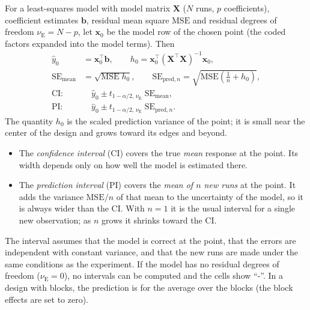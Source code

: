 For a least-squares model with model matrix $\mathbf{X}$ ($N$ runs, $p$ coefficients), coefficient estimates
$\mathbf{b}$, residual mean square $\text{MSE}$ and residual degrees of freedom $\nu_\text{E} = N - p$, let
$\mathbf{x}_0$ be the model row of the chosen point (the coded factors expanded into the model terms). Then
\citep{montgomery2017,myers2016}
\begin{align}
  \hat y_0 &= \mathbf{x}_0^\top \mathbf{b}, \qquad
  h_0 = \mathbf{x}_0^\top \left(\mathbf{X}^\top\mathbf{X}\right)^{-1} \mathbf{x}_0, \label{eq:ch10-pred}\\
  \text{SE}_\text{mean} &= \sqrt{\text{MSE}\; h_0}, \qquad
  \text{SE}_{\text{pred},n} = \sqrt{\text{MSE}\left(\frac{1}{n} + h_0\right)}, \label{eq:ch10-se}\\
  \text{CI}:&\quad \hat y_0 \pm t_{1-\alpha/2,\,\nu_\text{E}}\; \text{SE}_\text{mean}, \label{eq:ch10-ci}\\
  \text{PI}:&\quad \hat y_0 \pm t_{1-\alpha/2,\,\nu_\text{E}}\; \text{SE}_{\text{pred},n}. \label{eq:ch10-pi}
\end{align}
The quantity $h_0$ is the scaled prediction variance of the point; it is small near the center of the design and
grows toward its edges and beyond.
\begin{itemize}
  \item The \emph{confidence interval} (CI) covers the true \emph{mean} response at the point. Its width depends only
    on how well the model is estimated there.
  \item The \emph{prediction interval} (PI) covers the \emph{mean of $n$ new runs} at the point. It adds the
    variance $\text{MSE}/n$ of that mean to the uncertainty of the model, so it is always wider than the CI. With
    $n = 1$ it is the usual interval for a single new observation; as $n$ grows it shrinks toward the CI.
\end{itemize}
The interval assumes that the model is correct at the point, that the errors are independent with constant
variance, and that the new runs are made under the same conditions as the experiment. If the model has no residual
degrees of freedom ($\nu_\text{E} = 0$), no intervals can be computed and the cells show ``-''. In a design with
blocks, the prediction is for the average over the blocks (the block effects are set to zero).

